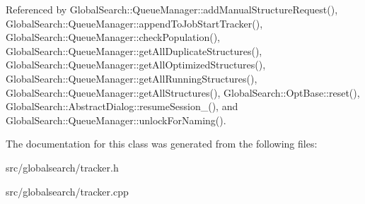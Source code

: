 Referenced by Global\-Search\-::\-Queue\-Manager\-::add\-Manual\-Structure\-Request(), Global\-Search\-::\-Queue\-Manager\-::append\-To\-Job\-Start\-Tracker(), Global\-Search\-::\-Queue\-Manager\-::check\-Population(), Global\-Search\-::\-Queue\-Manager\-::get\-All\-Duplicate\-Structures(), Global\-Search\-::\-Queue\-Manager\-::get\-All\-Optimized\-Structures(), Global\-Search\-::\-Queue\-Manager\-::get\-All\-Running\-Structures(), Global\-Search\-::\-Queue\-Manager\-::get\-All\-Structures(), Global\-Search\-::\-Opt\-Base\-::reset(), Global\-Search\-::\-Abstract\-Dialog\-::resume\-Session\-\_\-(), and Global\-Search\-::\-Queue\-Manager\-::unlock\-For\-Naming().



The documentation for this class was generated from the following files\-:\begin{DoxyCompactItemize}
\item 
src/globalsearch/tracker.\-h\item 
src/globalsearch/tracker.\-cpp\end{DoxyCompactItemize}
